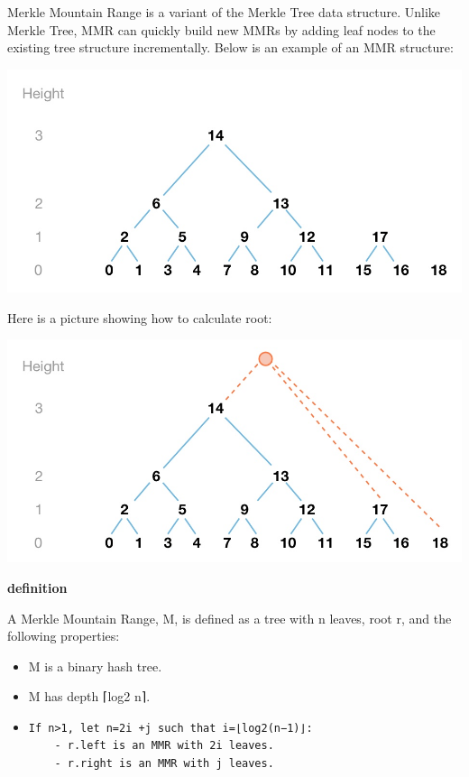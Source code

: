 Merkle Mountain Range is a variant of the Merkle Tree data structure. Unlike Merkle Tree, MMR can quickly build new MMRs by adding leaf nodes to the existing tree structure incrementally. Below is an example of an MMR structure:

\includegraphics[scale=0.2]{pic/MMR1.jpg}

Here is a picture showing how to calculate root:

\includegraphics[scale=0.2]{pic/MMR2.jpg}

\textbf{definition}

A Merkle Mountain Range, M, is defined as a tree with n leaves, root r, and the following properties:

\begin{itemize}
    \item  M is a binary hash tree.
    \item M has depth ⌈log2 n⌉.
    \item \begin{verbatim}
If n>1, let n=2i +j such that i=⌊log2(n−1)⌋:
    - r.left is an MMR with 2i leaves.
    - r.right is an MMR with j leaves.
    \end{verbatim}

\end{itemize}


